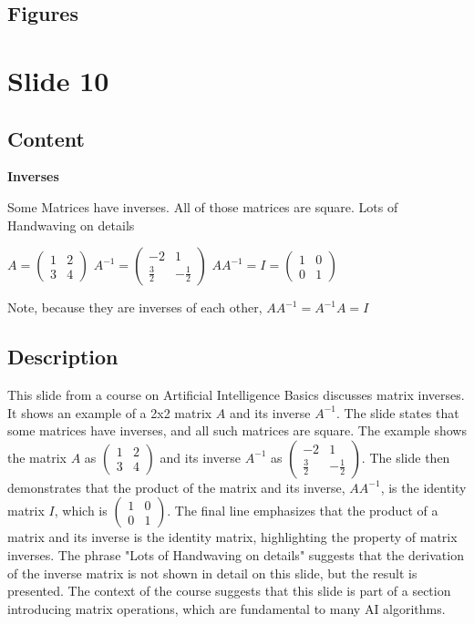 \documentclass{article}%
\begin{document}
\subsection{Figures}%
\begin{figure}[H]%
\centering%
\end{figure}

%
\newpage%
\section{Slide 10}%
\label{sec:Slide10}%
\subsection{Content}%

\textbf{Inverses}

Some Matrices have inverses. All of those matrices are square.
Lots of Handwaving on details

$A = \begin{pmatrix} 1 & 2 \\ 3 & 4 \end{pmatrix}$
$A^{-1} = \begin{pmatrix} -2 & 1 \\ \frac{3}{2} & -\frac{1}{2} \end{pmatrix}$
$AA^{-1} = I = \begin{pmatrix} 1 & 0 \\ 0 & 1 \end{pmatrix}$

Note, because they are inverses of each other, $AA^{-1} = A^{-1}A = I$
%
\subsection{Description}%
This slide from a course on Artificial Intelligence Basics discusses matrix inverses. It shows an example of a 2x2 matrix $A$ and its inverse $A^{-1}$.  The slide states that some matrices have inverses, and all such matrices are square.  The example shows the matrix $A$ as $\begin{pmatrix} 1 & 2 \\ 3 & 4 \end{pmatrix}$ and its inverse $A^{-1}$ as $\begin{pmatrix} -2 & 1 \\ \frac{3}{2} & -\frac{1}{2} \end{pmatrix}$.  The slide then demonstrates that the product of the matrix and its inverse, $AA^{-1}$, is the identity matrix $I$, which is $\begin{pmatrix} 1 & 0 \\ 0 & 1 \end{pmatrix}$.  The final line emphasizes that the product of a matrix and its inverse is the identity matrix, highlighting the property of matrix inverses.  The phrase "Lots of Handwaving on details" suggests that the derivation of the inverse matrix is not shown in detail on this slide, but the result is presented. The context of the course suggests that this slide is part of a section introducing matrix operations, which are fundamental to many AI algorithms.%
\end{document}
